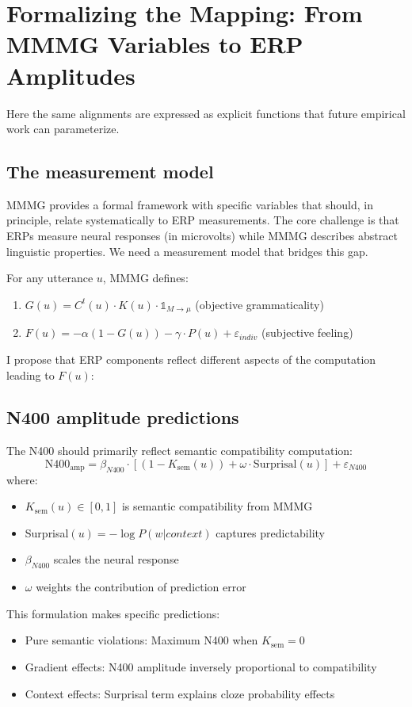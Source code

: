 \documentclass[12pt,letterpaper]{article}
\begin{document}
\section{Formalizing the Mapping: From MMMG Variables to ERP Amplitudes}

Here the same alignments are expressed as explicit functions that future empirical work can parameterize.


\subsection{The measurement model}

MMMG provides a formal framework with specific variables that should, in principle, relate systematically to ERP measurements. The core challenge is that ERPs measure neural responses (in microvolts) while MMMG describes abstract linguistic properties. We need a measurement model that bridges this gap.

For any utterance $u$, MMMG defines:
\begin{enumerate}
    \item $G(u) = C^t(u) \cdot K(u) \cdot \mathbb{1}_{M \to \mu}$ (objective grammaticality)
    \item $F(u) = -\alpha(1-G(u)) - \gamma \cdot P(u) + \varepsilon_{indiv}$ (subjective feeling)
\end{enumerate}
I propose that ERP components reflect different aspects of the computation leading to $F(u)$:

\subsection{N400 amplitude predictions}

The N400 should primarily reflect semantic compatibility computation:
\[
\text{N400}_{\text{amp}} = \beta_{N400} \cdot \left[(1 - K_{\text{sem}}(u)) + \omega \cdot \text{Surprisal}(u)\right] + \varepsilon_{N400}
\]
where:
\begin{itemize}
    \item $K_{\text{sem}}(u) \in [0,1]$ is semantic compatibility from MMMG
    \item Surprisal$(u) = -\log P(w|context)$ captures predictability
    \item $\beta_{N400}$ scales the neural response
    \item $\omega$ weights the contribution of prediction error
\end{itemize}

This formulation makes specific predictions:
\begin{itemize}
    \item Pure semantic violations: Maximum N400 when $K_{\text{sem}} = 0$
    \item Gradient effects: N400 amplitude inversely proportional to compatibility
    \item Context effects: Surprisal term explains cloze probability effects
\end{itemize}
\end{document}
